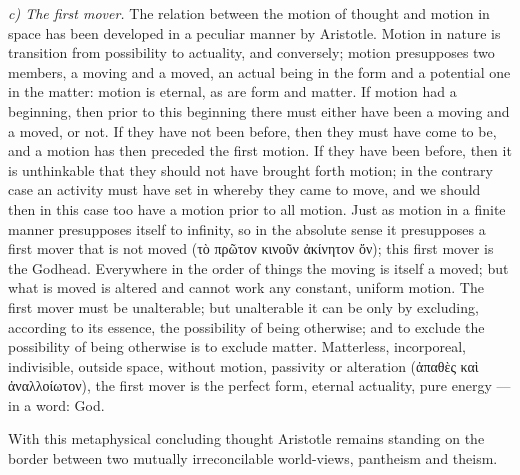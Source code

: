 \documentclass[12pt,a4paper]{book}
\newcommand{\runin}[1]{\emph{#1}\hspace{0.4em}}
\begin{document}
\runin{c) The first mover.} The relation between the motion of thought and motion in space has been
developed in a peculiar manner by Aristotle. Motion in nature is transition from possibility to
actuality, and conversely; motion presupposes two members, a moving and a moved, an actual being in
the form and a potential one in the matter: motion is eternal, as are form and matter. If motion had
a beginning, then prior to this beginning there must either have been a moving and a moved, or not.
If they have not been before, then they must have come to be, and a motion has then preceded the
first motion. If they have been before, then it is unthinkable
that they should not have brought forth motion; in the contrary case an activity must have set in
whereby they came to move, and we should then in this case too have a motion prior to all motion.
Just as motion in a finite manner presupposes itself to infinity, so in the absolute sense it
presupposes a first mover that is not moved (τὸ πρῶτον κινοῦν ἀκίνητον ὄν); this first mover is
the Godhead. Everywhere in the order of things the moving is itself a moved; but what is moved is
altered and cannot work any constant, uniform motion. The first mover must be unalterable; but
unalterable it can be only by excluding, according to its essence, the possibility of being otherwise;
and to exclude the possibility of being otherwise is to exclude matter. Matterless, incorporeal,
indivisible, outside space, without motion, passivity or alteration (ἀπαθὲς καὶ ἀναλλοίωτον), the
first mover is the perfect form, eternal actuality, pure energy --- in a word: God.

With this metaphysical concluding thought Aristotle remains standing on the border between two
mutually irreconcilable world-views, pantheism and theism.
\end{document}
